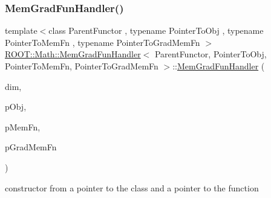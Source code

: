 \subsubsection{\texorpdfstring{MemGradFunHandler()}{MemGradFunHandler()}\hspace{0.1cm}{\footnotesize\ttfamily [4/6]}}
{\footnotesize\ttfamily template$<$class Parent\+Functor , typename Pointer\+To\+Obj , typename Pointer\+To\+Mem\+Fn , typename Pointer\+To\+Grad\+Mem\+Fn $>$ \\
\mbox{\hyperlink{classROOT_1_1Math_1_1MemGradFunHandler}{R\+O\+O\+T\+::\+Math\+::\+Mem\+Grad\+Fun\+Handler}}$<$ Parent\+Functor, Pointer\+To\+Obj, Pointer\+To\+Mem\+Fn, Pointer\+To\+Grad\+Mem\+Fn $>$\+::\mbox{\hyperlink{classROOT_1_1Math_1_1MemGradFunHandler}{Mem\+Grad\+Fun\+Handler}} (\begin{DoxyParamCaption}\item[{unsigned int}]{dim,  }\item[{const Pointer\+To\+Obj \&}]{p\+Obj,  }\item[{Pointer\+To\+Mem\+Fn}]{p\+Mem\+Fn,  }\item[{Pointer\+To\+Grad\+Mem\+Fn}]{p\+Grad\+Mem\+Fn }\end{DoxyParamCaption})\hspace{0.3cm}{\ttfamily [inline]}}



constructor from a pointer to the class and a pointer to the function 

\mbox{\label{classROOT_1_1Math_1_1MemGradFunHandler_afb840379796fb7d05d885bc3152a3175}} 
